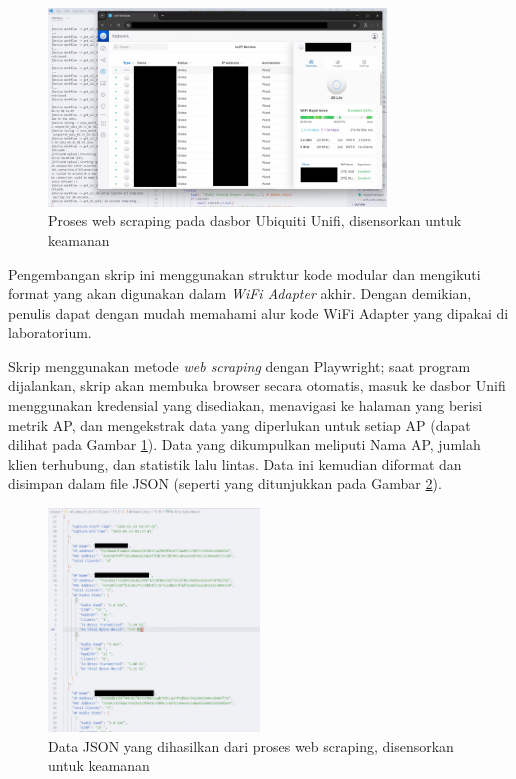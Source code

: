 \begin{figure}[htbp]
    \centering
    \includegraphics[width=0.8\textwidth]{assets/pics/unifi.png}
    \caption{Proses web scraping pada dasbor Ubiquiti Unifi, disensorkan untuk keamanan}
    \label{fig:unifi}
\end{figure}

Pengembangan skrip ini menggunakan struktur kode modular dan mengikuti format yang akan digunakan dalam \textit{WiFi Adapter} akhir. Dengan demikian, penulis dapat dengan mudah memahami alur kode WiFi Adapter yang dipakai di laboratorium.

Skrip menggunakan metode \textit{web scraping} dengan Playwright; saat program dijalankan, skrip akan membuka browser secara otomatis, masuk ke dasbor Unifi menggunakan kredensial yang disediakan, menavigasi ke halaman yang berisi metrik AP, dan mengekstrak data yang diperlukan untuk setiap AP (dapat dilihat pada Gambar \ref{fig:unifi}). Data yang dikumpulkan meliputi Nama AP, jumlah klien terhubung, dan statistik lalu lintas. Data ini kemudian diformat dan disimpan dalam file JSON (seperti yang ditunjukkan pada Gambar \ref{fig:unifijson}).

\begin{figure}[htbp]
    \centering
    \includegraphics[width=0.5\textwidth]{assets/pics/unifijson.png}
    \caption{Data JSON yang dihasilkan dari proses web scraping, disensorkan untuk keamanan}
    \label{fig:unifijson}
\end{figure}


